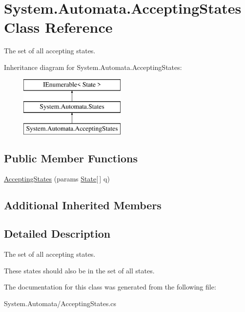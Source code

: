 \hypertarget{class_system_1_1_automata_1_1_accepting_states}{}\section{System.\+Automata.\+Accepting\+States Class Reference}
\label{class_system_1_1_automata_1_1_accepting_states}


The set of all accepting states.  


Inheritance diagram for System.\+Automata.\+Accepting\+States\+:\begin{figure}[H]
\begin{center}
\leavevmode
\includegraphics[height=3.000000cm]{class_system_1_1_automata_1_1_accepting_states}
\end{center}
\end{figure}
\subsection*{Public Member Functions}
\begin{DoxyCompactItemize}
\item 
\mbox{\label{class_system_1_1_automata_1_1_accepting_states_a1a1e9e2be597a9c235c8940867466f64}} 
\mbox{\hyperlink{class_system_1_1_automata_1_1_accepting_states_a1a1e9e2be597a9c235c8940867466f64}{Accepting\+States}} (params \mbox{\hyperlink{class_system_1_1_automata_1_1_state}{State}}\mbox{[}$\,$\mbox{]} q)
\end{DoxyCompactItemize}
\subsection*{Additional Inherited Members}


\subsection{Detailed Description}
The set of all accepting states. 

These states should also be in the set of all states.

The documentation for this class was generated from the following file\+:\begin{DoxyCompactItemize}
\item 
System.\+Automata/Accepting\+States.\+cs\end{DoxyCompactItemize}
